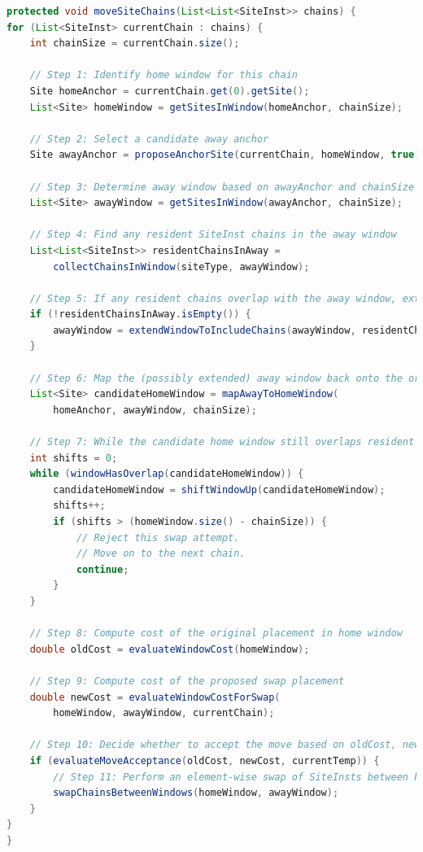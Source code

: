 \begin{lstlisting}[language=Java, caption={Chain Swapping Pseudocode}, label={lst:chain_swap_pseudocode}]
protected void moveSiteChains(List<List<SiteInst>> chains) {
for (List<SiteInst> currentChain : chains) {
    int chainSize = currentChain.size();

    // Step 1: Identify home window for this chain
    Site homeAnchor = currentChain.get(0).getSite();
    List<Site> homeWindow = getSitesInWindow(homeAnchor, chainSize);

    // Step 2: Select a candidate away anchor
    Site awayAnchor = proposeAnchorSite(currentChain, homeWindow, true);

    // Step 3: Determine away window based on awayAnchor and chainSize
    List<Site> awayWindow = getSitesInWindow(awayAnchor, chainSize);

    // Step 4: Find any resident SiteInst chains in the away window
    List<List<SiteInst>> residentChainsInAway = 
        collectChainsInWindow(siteType, awayWindow);

    // Step 5: If any resident chains overlap with the away window, extend the away window to fully accomodate them 
    if (!residentChainsInAway.isEmpty()) {
        awayWindow = extendWindowToIncludeChains(awayWindow, residentChainsInAway);
    }

    // Step 6: Map the (possibly extended) away window back onto the original region so that the tail of that window coincides with the tail of the current chain
    List<Site> candidateHomeWindow = mapAwayToHomeWindow(
        homeAnchor, awayWindow, chainSize);

    // Step 7: While the candidate home window still overlaps resident chains, shift upward
    int shifts = 0;
    while (windowHasOverlap(candidateHomeWindow)) {
        candidateHomeWindow = shiftWindowUp(candidateHomeWindow);
        shifts++;
        if (shifts > (homeWindow.size() - chainSize)) {
            // Reject this swap attempt.
            // Move on to the next chain.
            continue;
        }
    }

    // Step 8: Compute cost of the original placement in home window
    double oldCost = evaluateWindowCost(homeWindow);

    // Step 9: Compute cost of the proposed swap placement
    double newCost = evaluateWindowCostForSwap(
        homeWindow, awayWindow, currentChain);

    // Step 10: Decide whether to accept the move based on oldCost, newCost, and temperature
    if (evaluateMoveAcceptance(oldCost, newCost, currentTemp)) {
        // Step 11: Perform an element-wise swap of SiteInsts between homeWindow and awayWindow
        swapChainsBetweenWindows(homeWindow, awayWindow);
    }
}
}
\end{lstlisting}


